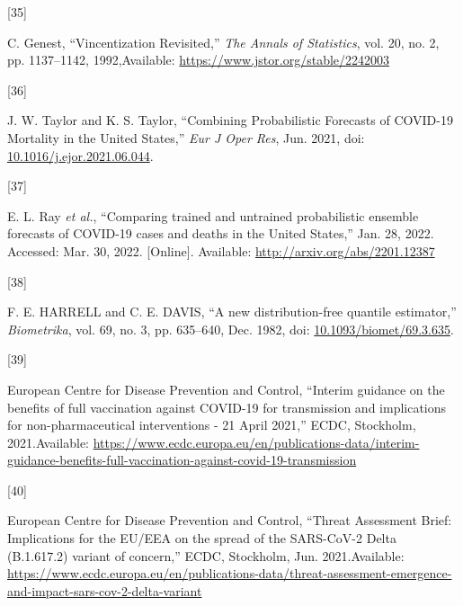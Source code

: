 \documentclass[
]{article}
\newlength{\cslhangindent}
\newlength{\csllabelwidth}
\newlength{\cslentryspacingunit} %
\newenvironment{CSLReferences}[2] %
 {%
  \setlength{\parindent}{0pt}
  \ifodd #1
  \let\oldpar\par
  \def\par{\hangindent=\cslhangindent\oldpar}
  \fi
  \setlength{\parskip}{#2\cslentryspacingunit}
 }%
 {}
\newcommand{\CSLLeftMargin}[1]{\parbox[t]{\csllabelwidth}{#1}}
\newcommand{\CSLRightInline}[1]{\parbox[t]{\linewidth - \csllabelwidth}{#1}\break}
\begin{document}
\begin{CSLReferences}{0}{0}
\leavevmode{}%
\CSLLeftMargin{{[}35{]} }
\CSLRightInline{C. Genest, {``Vincentization {Revisited},''} \emph{The Annals of Statistics}, vol. 20, no. 2, pp. 1137--1142, 1992,Available: \url{https://www.jstor.org/stable/2242003}}

\leavevmode{}%
\CSLLeftMargin{{[}36{]} }
\CSLRightInline{J. W. Taylor and K. S. Taylor, {``Combining {Probabilistic Forecasts} of {COVID-19 Mortality} in the {United States},''} \emph{Eur J Oper Res}, Jun. 2021, doi: \href{https://doi.org/10.1016/j.ejor.2021.06.044}{10.1016/j.ejor.2021.06.044}.}

\leavevmode{}%
\CSLLeftMargin{{[}37{]} }
\CSLRightInline{E. L. Ray \emph{et al.}, {``Comparing trained and untrained probabilistic ensemble forecasts of {COVID-19} cases and deaths in the {United States},''} Jan. 28, 2022. Accessed: Mar. 30, 2022. {[}Online{]}. Available: \url{http://arxiv.org/abs/2201.12387}}

\leavevmode{}%
\CSLLeftMargin{{[}38{]} }
\CSLRightInline{F. E. HARRELL and C. E. DAVIS, {``A new distribution-free quantile estimator,''} \emph{Biometrika}, vol. 69, no. 3, pp. 635--640, Dec. 1982, doi: \href{https://doi.org/10.1093/biomet/69.3.635}{10.1093/biomet/69.3.635}.}

\leavevmode{}%
\CSLLeftMargin{{[}39{]} }
\CSLRightInline{European Centre for Disease Prevention and Control, {``Interim guidance on the benefits of full vaccination against {COVID-19} for transmission and implications for non-pharmaceutical interventions - 21 {April} 2021,''} {ECDC}, {Stockholm}, 2021.Available: \url{https://www.ecdc.europa.eu/en/publications-data/interim-guidance-benefits-full-vaccination-against-covid-19-transmission}}

\leavevmode{}%
\CSLLeftMargin{{[}40{]} }
\CSLRightInline{European Centre for Disease Prevention and Control, {``Threat {Assessment Brief}: {Implications} for the {EU}/{EEA} on the spread of the {SARS-CoV-2 Delta} ({B}.1.617.2) variant of concern,''} {ECDC}, {Stockholm}, Jun. 2021.Available: \url{https://www.ecdc.europa.eu/en/publications-data/threat-assessment-emergence-and-impact-sars-cov-2-delta-variant}}


\end{CSLReferences}
\end{document}
